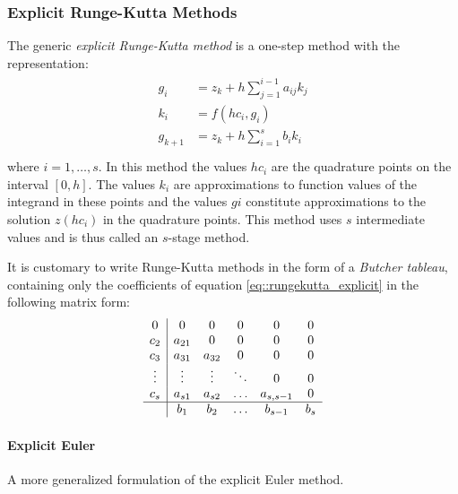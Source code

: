 \subsubsection{Explicit Runge-Kutta Methods}
The generic \textit{explicit Runge-Kutta method} is a one-step method with the representation:
\begin{equation}
	\begin{split}
	\begin{aligned}
		g_i &= z_k + h\sum_{j=1}^{i-1}a_{ij}k_j \\
		k_i &= f(hc_i,g_i) \\
		g_{k+1} &= z_k + h\sum_{i=1}^{s}b_ik_i \\
	\end{aligned}
	\end{split}
	\label{eq::rungekutta_explicit}
\end{equation}
where $i=1,\dots,s$. In this method the values $hc_i$ are the quadrature points on the interval $[0, h]$. The values $k_i$ are approximations to function values of the integrand in these points and the values $g i$ constitute approximations to the solution $z(hc_i)$ in the quadrature points. This method uses $s$ intermediate values and is thus called an $s$-stage method.

\begin{definition}
	It is customary to write Runge-Kutta methods in the form of a \textit{Butcher tableau}, containing only the coefficients of equation \ref{eq::rungekutta_explicit} in the following matrix form:
	\begin{equation}
		\begin{array}
			{c|ccccc}
			0      &  0     & 0      & 0      & 0         & 0 \\
			c_2    & a_{21} & 0      & 0      & 0         & 0 \\
			c_3    & a_{31} & a_{32} & 0      & 0         & 0 \\
			\vdots & \vdots & \vdots & \ddots & 0         & 0 \\
			c_s    & a_{s1} & a_{s2} & \ldots & a_{s,s-1} & 0 \\ \hline
			       & b_1    & b_2    & \ldots & b_{s-1}   & b_s
		\end{array}
	\end{equation}
\end{definition}

\paragraph{Explicit Euler}
A more generalized formulation of the explicit Euler method.

